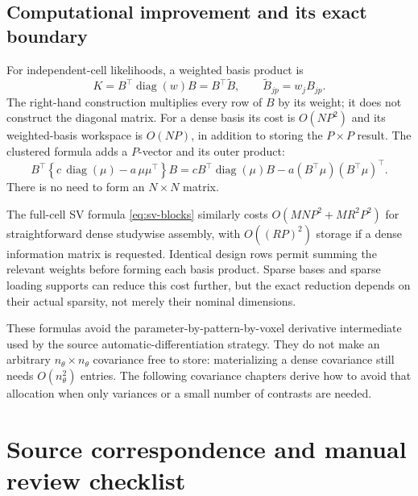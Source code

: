 \documentclass[11pt,a4paper]{article}
\newcommand{\diag}{\operatorname{diag}}
\numberwithin{equation}{section}
\begin{document}
\subsection{Computational improvement and its exact boundary}
For independent-cell likelihoods, a weighted basis product is
\[
 K=B^\top\diag(w)B=B^\top\widetilde B,\qquad
 \widetilde B_{jp}=w_jB_{jp}.
\]
The right-hand construction multiplies every row of $B$ by its
weight; it does not construct the diagonal matrix.
For a dense basis its cost is $O(NP^2)$ and its weighted-basis workspace
is $O(NP)$, in addition to storing the $P\times P$ result.
The clustered formula adds a $P$-vector and its outer product:
\[
 B^\top\left\{c\,\diag(\mu)-a\,\mu\mu^\top\right\}B
 =cB^\top\diag(\mu)B-a(B^\top\mu)(B^\top\mu)^\top.
\]
There is no need to form an $N\times N$ matrix.

The full-cell SV formula \eqref{eq:sv-blocks} similarly costs
$O(MNP^2+MR^2P^2)$ for straightforward dense studywise assembly,
with $O((RP)^2)$ storage if a dense information matrix is requested.
Identical design rows permit summing the relevant weights before
forming each basis product. Sparse bases and sparse loading supports
can reduce this cost further, but the exact reduction depends on
their actual sparsity, not merely their nominal dimensions.

These formulas avoid the parameter-by-pattern-by-voxel derivative
intermediate used by the source automatic-differentiation strategy.
They do not make an arbitrary $n_\theta\times n_\theta$ covariance free to store:
materializing a dense covariance still needs $O(n_\theta^2)$ entries.
The following covariance chapters derive how to avoid that allocation
when only variances or a small number of contrasts are needed.



\section{Source correspondence and manual review checklist}
\label{sec:review}
\end{document}
